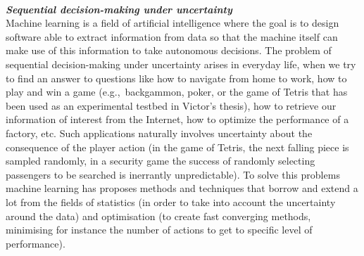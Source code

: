 \noindent \textbf{\textit{\\Sequential decision-making under uncertainty}}\\
Machine learning is a field of artificial intelligence where the goal is to design software able to extract information from data so that the machine itself can make use of this information to take  autonomous decisions.
The problem of sequential decision-making under uncertainty arises in everyday life, when we try to find an answer to questions like how to navigate from home to work, how to play and win a game (e.g.,~backgammon, poker, or the game of Tetris that has been used as an experimental testbed in Victor's thesis), how to retrieve our information of interest from the Internet, how to optimize the performance of a factory, etc. Such applications naturally involves uncertainty about the consequence of the player action (in the game of Tetris, the next falling piece is sampled randomly, in a security game the success of randomly selecting passengers to be searched is inerrantly unpredictable). To solve this problems machine learning has proposes methods and techniques that borrow and extend a lot from the fields of statistics (in order to take into account the uncertainty around the data) and optimisation (to create fast converging methods, minimising for instance the number of actions to get to specific level of performance). %


